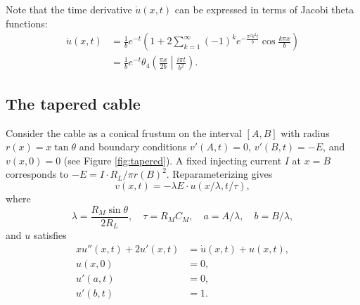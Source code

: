 \documentclass[parskip=half]{scrartcl}
\theoremstyle{nonumberplain}
\begin{document}
Note that the time derivative $\dot u(x,t)$ can be expressed in terms of Jacobi theta functions:
\begin{equation}
    \begin{aligned}
        \dot u(x,t) &= \frac{1}{b}e^{-t}\left(1+2\sum_{k=1}^{\infty} (-1)^ke^{-\frac{\pi^2 k^2 t}{b}}\cos\frac{k\pi x}{b}\right)\\
        &= \frac{1}{b}e^{-t}\theta_4\left(\frac{\pi x}{2 b}\middle| \frac{i\pi t}{b^2}\right).
    \end{aligned}
\end{equation}

\subsection{The tapered cable}

Consider the cable as a conical frustum on the interval $[A, B]$ with radius
$r(x) = x \tan\theta$ and boundary conditions $v'(A, t) = 0$, $v'(B, t) = -E$,
and $v(x, 0) = 0$ (see Figure \ref{fig:tapered}). A fixed injecting current $I$
at $x=B$ corresponds to $-E=I\cdot R_L/\pi r(B)^2$. Reparameterizing gives
\begin{equation}
    v(x, t) = -\lambda E\cdot u(x/\lambda, t/\tau),
\end{equation}
where
\begin{equation}
    \lambda = \frac{R_M\sin\theta}{2 R_L}, \quad \tau = R_M C_M, \quad a = A/\lambda, \quad b = B/\lambda,
\end{equation}
and $u$ satisfies
\begin{equation}
    \label{eq:conu}
    \begin{aligned}
        x u''(x, t) + 2 u'(x, t) &= \dot u(x, t) + u(x, t),\\
        u(x, 0) &= 0,\\
        u'(a, t) &= 0,\\
        u'(b, t) &= 1.
    \end{aligned}
\end{equation}
\end{document}
